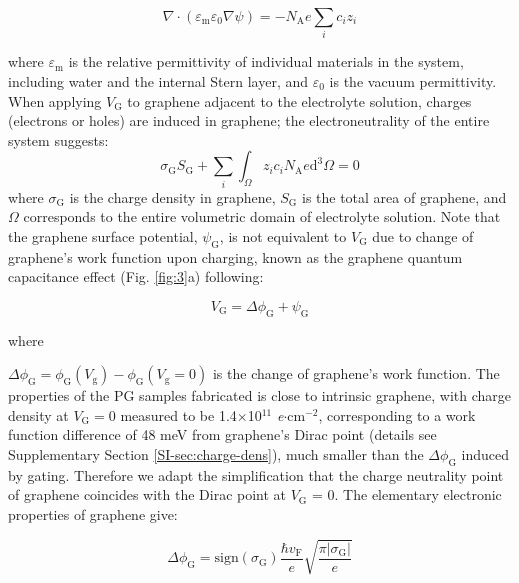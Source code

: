 \documentclass[journal=langd5,email=true, hyperref=true, keywords=false]{achemso}
\newcommand{\Fig}{Fig.}
\begin{document}
\begin{equation}
  \label{eq:poisson}
  \nabla \cdot (\varepsilon_{\mathrm{m}} \varepsilon_{0} \nabla \psi)
  =
  - N_{\mathrm{A}} e \sum_{i} c_{i} z_{i}
\end{equation}

where $\varepsilon_{\mathrm{m}}$ is the relative permittivity of
individual materials in the system, including water and the internal
Stern layer\cite{Tian_2017}, and
$\varepsilon_{0}$ is the vacuum permittivity. When applying
$V_{\mathrm{G}}$ to graphene adjacent to the electrolyte solution,
charges (electrons or holes) are induced in graphene; the
electroneutrality of the entire system suggests:
\begin{equation}
  \label{eq:electro-neutral}
  \sigma_{\mathrm{G}} S_{\mathrm{G}} + \sum_{i} \int_{\Omega} z_{i} c_{i} N_{\mathrm{A}} e \mathrm{d}^{3} \Omega= 0
\end{equation}
where $\sigma_{\mathrm{G}}$ is the charge density in graphene,
$S_{\mathrm{G}}$ is the total area of graphene, and $\Omega$
corresponds to the entire volumetric domain of electrolyte
solution. Note that the graphene surface potential,
$\psi_{\mathrm{G}}$, is not equivalent to $V_{\mathrm{G}}$ due to
change of graphene's work function upon charging, known as the
graphene quantum capacitance effect\cite{Xia_2009} (\Fig{}
\ref{fig:3}a) following:

\begin{equation}
  \label{eq:Vg}
  V_{\mathrm{G}} = \Delta \phi_{\mathrm{G}} + \psi_{\mathrm{G}}
\end{equation}

where

$\Delta \phi_{\mathrm{G}} = \phi_{\mathrm{G}}(V_{\mathrm{g}}) -
\phi_{\mathrm{G}}(V_{\mathrm{g}}=0)$ is the change of graphene’s work
function. The properties of the PG samples fabricated is close to
intrinsic graphene, with charge density at $V_{\mathrm{G}}=0$ measured
to be 1.4$\times$10$^{11}$ \textit{e}$\cdot$cm$^{-2}$, corresponding
to a work function difference of 48 meV from graphene's Dirac point
(details see Supplementary Section \ref{SI-sec:charge-dens}), much
smaller than the $\Delta \phi_{\mathrm{G}}$ induced by gating.
Therefore we adapt the simplification that the charge neutrality point
of graphene coincides with the Dirac point at $V_{\mathrm{G}}$ =
0. The elementary electronic properties of graphene give:

\begin{equation}
  \label{eq:delta-phiG}
  \Delta \phi_{\mathrm{G}} = \mathrm{sign}(\sigma_{\mathrm{G}}) \frac{\hbar v_{\mathrm{F}}}{e}
  \sqrt{\frac{\pi |\sigma_{\mathrm{G}}|}{e}}
\end{equation}
\end{document}
